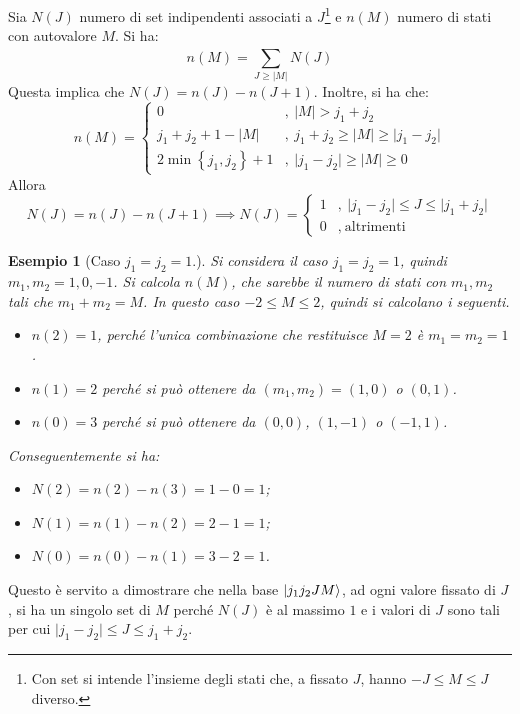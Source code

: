 \documentclass[11pt, a4paper]{scrartcl} %
\numberwithin{equation}{subsection}
\theoremstyle{style2}
\theoremstyle{style1}
\newtheorem{esempio}{Esempio}[section]
\begin{document}
Sia $N(J)$ numero di set indipendenti associati a $J$\footnote{Con set si intende l'insieme degli stati che, a fissato $J$, hanno $-J\le M\le J$ diverso.} e $n(M)$ numero di stati con autovalore $M$.
Si ha:
\begin{equation}
	n(M) = \sum_{J\ge |M|}^{} N(J)
\end{equation}
Questa implica che $N(J) = n(J) - n(J+1)$. Inoltre, si ha che:
\begin{equation}
	n(M) = \begin{cases}
		0&,\ \lvert M \rvert > j_1+j_2\\
		j_1+j_2+1-\lvert M \rvert &,\ j_1+j_2 \ge \lvert M \rvert \ge \lvert j_1-j_2 \rvert \\
		2 \min\left\{ j_1,j_2 \right\} +1 &,\ \lvert j_1-j_2 \rvert \ge \lvert M \rvert \ge 0
	\end{cases}
\end{equation}
Allora 
\begin{equation}
	N(J) = n(J) - n(J+1) \implies N(J) =\begin{cases}
		1 &,\ \lvert j_1-j_2 \rvert \le J\le \lvert j_1+j_2 \rvert \\
		0&,\ \text{altrimenti }
	\end{cases}
\end{equation}
\begin{esempio}[Caso $j_1=j_2=1$.]
	Si considera il caso $j_1 = j_2 = 1$, quindi $m_1, m_2 = 1,0,-1$. 
	Si calcola $n(M)$, che sarebbe il numero di stati con $m_1,m_2 $ tali che $m_1+m_2=M$.
In questo caso $-2\le M\le 2$, quindi si calcolano i seguenti.
\begin{itemize}
	\item $n(2) = 1$, perch\'e l'unica combinazione che restituisce $M = 2$ \`e $m_1=m_2 = 1$.
	\item $n(1) = 2$ perch\'e si pu\`o ottenere da $(m_1,m_2) = (1,0)$ o $(0,1)$.
	\item $n(0) = 3$ perch\'e si pu\`o ottenere da $(0,0)$, $ (1,-1)$ o $(-1,1)$.
\end{itemize}
Conseguentemente si ha:
\begin{itemize}
	\item $N(2) = n(2) - n(3) = 1 - 0 = 1$;
	\item $N(1) = n(1) - n(2) = 2 - 1 = 1$;
	\item $N(0) = n(0) - n(1) = 3 - 2 = 1$.
\end{itemize}
\end{esempio}
Questo \`e servito a dimostrare che nella base $\ket{j_1 j_2 JM} $, ad ogni valore fissato di $J$, si ha un singolo set di $M$ perch\'e $N(J)$ \`e al massimo $1$ e i valori di $J$ sono tali per cui $\lvert j_1-j_2 \rvert \le J \le j_1+j_2$. 
\end{document}
